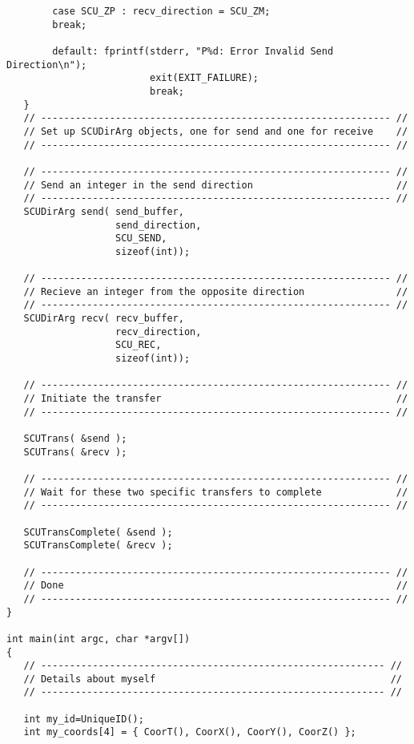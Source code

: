 {\begin{verbatim}
        case SCU_ZP : recv_direction = SCU_ZM;
        break;

        default: fprintf(stderr, "P%d: Error Invalid Send Direction\n");
                         exit(EXIT_FAILURE);
                         break;
   }
   // ------------------------------------------------------------- //
   // Set up SCUDirArg objects, one for send and one for receive    //
   // ------------------------------------------------------------- //

   // ------------------------------------------------------------- //
   // Send an integer in the send direction                         //
   // ------------------------------------------------------------- //
   SCUDirArg send( send_buffer,
                   send_direction,
                   SCU_SEND,
                   sizeof(int));

   // ------------------------------------------------------------- //
   // Recieve an integer from the opposite direction                //
   // ------------------------------------------------------------- //
   SCUDirArg recv( recv_buffer,
                   recv_direction,
                   SCU_REC,
                   sizeof(int));

   // ------------------------------------------------------------- //
   // Initiate the transfer                                         //
   // ------------------------------------------------------------- //

   SCUTrans( &send );
   SCUTrans( &recv );

   // ------------------------------------------------------------- //
   // Wait for these two specific transfers to complete             //
   // ------------------------------------------------------------- //

   SCUTransComplete( &send );
   SCUTransComplete( &recv );

   // ------------------------------------------------------------- //
   // Done                                                          //
   // ------------------------------------------------------------- //
}

int main(int argc, char *argv[])
{
   // ------------------------------------------------------------ //
   // Details about myself                                         //
   // ------------------------------------------------------------ //

   int my_id=UniqueID();
   int my_coords[4] = { CoorT(), CoorX(), CoorY(), CoorZ() };


\end{verbatim}}
